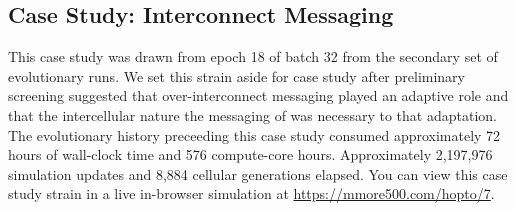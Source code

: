 \subsection{Case Study: Interconnect Messaging}



This case study was drawn from epoch 18 of batch 32 from the secondary set of evolutionary runs.
We set this strain aside for case study after preliminary screening suggested that over-interconnect messaging played an adaptive role and that the intercellular nature the messaging of was necessary to that adaptation.
The evolutionary history preceeding this case study consumed approximately 72 hours of wall-clock time and 576 compute-core hours.
Approximately 2,197,976 simulation updates and 8,884 cellular generations elapsed.
You can view this case study strain in a live in-browser simulation at \url{https://mmore500.com/hopto/7}.
